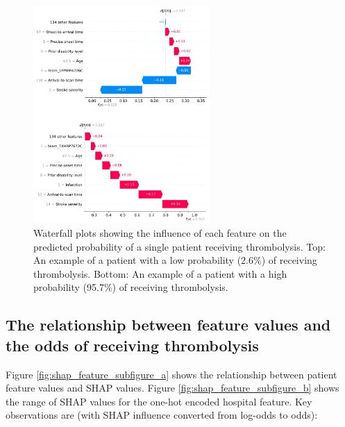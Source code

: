 \begin{figure}[!h]
\centering
\includegraphics[width=0.6\textwidth]{./images/waterfall}
\caption{Waterfall plots showing the influence of each feature on the predicted probability of a single patient receiving thrombolysis. Top: An example of a patient with a low probability (2.6\%) of receiving thrombolysis. Bottom: An example of a patient with a high probability (95.7\%) of receiving thrombolysis.}
\label{fig:results_waterfall}
\end{figure}


\subsection{The relationship between feature values and the odds of receiving thrombolysis}

Figure \ref{fig:shap_feature_subfigure_a} shows the relationship between patient feature values and SHAP values. Figure \ref{fig:shap_feature_subfigure_b} shows the range of SHAP values for the one-hot encoded hospital feature. Key observations are (with SHAP influence converted from log-odds to odds):

